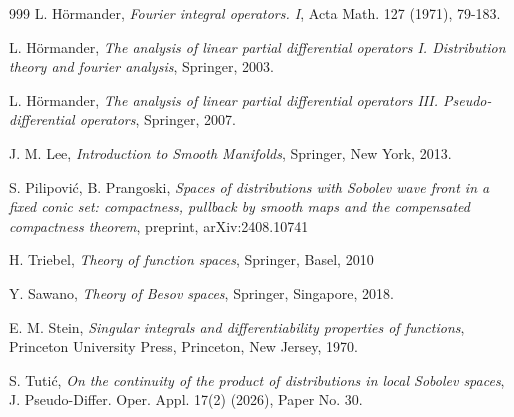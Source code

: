 \documentclass[12pt,reqno]{amsart}
\theoremstyle{plain}
\theoremstyle{remark}
\theoremstyle{definition}
\numberwithin{equation}{section}
\begin{document}
\begin{thebibliography}{999}
 L. H\"ormander, \textit{Fourier integral operators. I}, Acta Math. 127 (1971), 79-183.

 L. H\"ormander, \textit{The analysis of linear partial differential operators I. Distribution theory and fourier analysis}, Springer, 2003.

 L. H\"ormander, \textit{The analysis of linear partial differential operators III. Pseudo-differential operators}, Springer, 2007.

 J. M. Lee, \textit{Introduction to Smooth Manifolds}, Springer, New York, 2013.

 S. Pilipovi\'c, B. Prangoski, \textit{Spaces of distributions with Sobolev wave front in a fixed conic set: compactness, pullback by smooth maps and the compensated compactness theorem}, preprint, arXiv:2408.10741

 H. Triebel, \textit{Theory of function spaces}, Springer, Basel, 2010

 Y. Sawano, \textit{Theory of Besov spaces}, Springer, Singapore, 2018.

 E. M. Stein, \textit{Singular integrals and differentiability properties of functions}, Princeton University Press, Princeton, New Jersey, 1970.

 S. Tuti\'c, \textit{On the continuity of the product of distributions in local Sobolev spaces}, J. Pseudo-Differ. Oper. Appl. 17(2) (2026), Paper No. 30.
    
\end{thebibliography}
\end{document}
